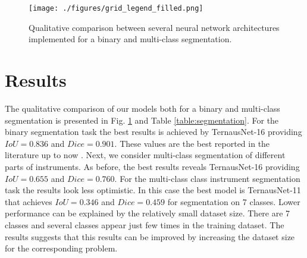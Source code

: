 \documentclass[runningheads,a4paper]{llncs}[2015/06/24]
\begin{document}
\begin{figure}[!t]
\centering
\texttt{[image: ./figures/grid\_legend\_filled.png]}
\caption{Qualitative comparison between several  neural network architectures implemented for a binary and multi-class segmentation.}
\label{fig::grid_legend}
\end{figure}

\section{Results}
The qualitative comparison of our models both for a binary and multi-class segmentation is presented in Fig. \ref{fig::grid_legend} and Table \ref{table:segmentation}. For the binary segmentation task the best results is achieved by TernausNet-16 providing $IoU = 0.836$ and $Dice = 0.901$. These values are the best reported in the literature up to now \cite{pakhomov2017deep, garcia2017toolnet}. Next, we consider multi-class segmentation of different parts of instruments. As before, the best results reveals TernausNet-16 providing $IoU = 0.655$ and $Dice = 0.760$. For the multi-class class instrument segmentation task the results look less optimistic. In this case the best model is TernausNet-11 that achieves $IoU = 0.346$ and $Dice= 0.459$ for segmentation on 7 classes. Lower performance can be explained by the relatively small dataset size. There are 7 classes and several classes appear just few times in the training dataset.
The results suggests that this results can be  improved by increasing the dataset size for the corresponding problem.
\end{document}
